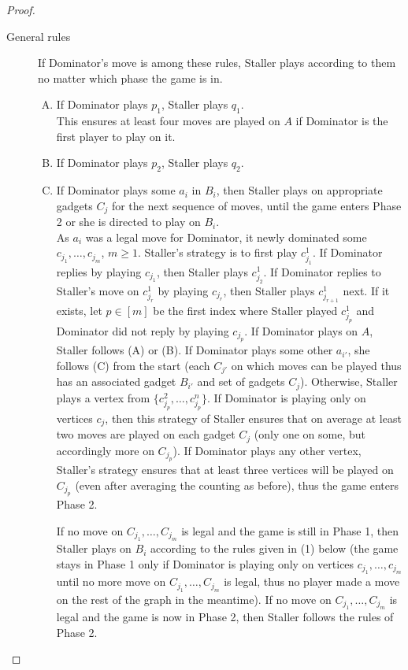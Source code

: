 \documentclass[12pt]{article}
\begin{document}
\begin{proof}
	\begin{description}
		\item [General rules] If Dominator's move is among these rules, Staller plays according to them no matter which phase the game is in.
		\begin{enumerate}[(A)]
			\item If Dominator plays $p_1$, Staller plays $q_1$.\\
			This ensures at least four moves are played on $A$ if Dominator is the first player to play on it.
			\item If Dominator plays $p_2$, Staller plays $q_2$.
			\item If Dominator plays some $a_i$ in $B_i$, then Staller plays on appropriate gadgets $C_j$ for the next sequence of moves, until the game enters Phase 2 or she is directed to play on $B_i$.\\
			As $a_i$ was a legal move for Dominator, it newly dominated some $c_{j_1}, \ldots, c_{j_m}$, $m\geq 1$. Staller's strategy is to first play $c_{j_1}^1$. If Dominator replies by playing $c_{j_1}$, then Staller plays $c_{j_2}^1$. If Dominator replies to Staller's move on $c_{j_r}^1$ by playing $c_{j_r}$, then Staller plays $c_{j_{r+1}}^1$ next. If it exists, let $p \in [m]$ be the first index where Staller played $c_{j_p}^1$ and Dominator did not reply by playing $c_{j_p}$. If Dominator plays on $A$, Staller follows (A) or (B). If Dominator plays some other $a_{i'}$, she follows (C) from the start (each $C_{j'}$ on which moves can be played thus has an associated gadget $B_{i'}$ and set of gadgets $C_j$). Otherwise, Staller plays a vertex from $\{c_{j_p}^2, \ldots, c_{j_p}^n\}$. If Dominator is playing only on vertices $c_j$, then this strategy of Staller ensures that on average at least two moves are played on each gadget $C_j$ (only one on some, but accordingly more on $C_{j_p}$). If Dominator plays any other vertex, Staller's strategy ensures that at least three vertices will be played on $C_{j_p}$ (even after averaging the counting as before), thus the game enters Phase 2.
			
			If no move on $C_{j_1}, \ldots, C_{j_m}$ is legal and the game is still in Phase 1, then Staller plays on $B_i$ according to the rules given in (1) below (the game stays in Phase 1 only if Dominator is playing only on vertices $c_{j_1}, \ldots, c_{j_m}$ until no more move on $C_{j_1}, \ldots, C_{j_m}$ is legal, thus no player made a move on the rest of the graph in the meantime). If no move on $C_{j_1}, \ldots, C_{j_m}$ is legal and the game is now in Phase 2, then Staller follows the rules of Phase 2.
		\end{enumerate}
		

\end{description}
\end{proof}
\end{document}
